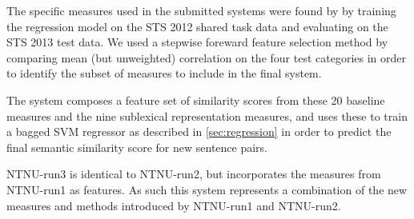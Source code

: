 
The specific measures used in the submitted systems were found by by training the regression model on the STS 2012 shared task data and evaluating on the STS 2013 test data. We used a stepwise foreward feature selection method by comparing mean (but unweighted) correlation on the four test categories in order to identify the subset of measures to include in the final system.

The system composes a feature set of similarity scores from these 20 baseline measures and the nine sublexical representation measures, and uses these to train a bagged SVM regressor as described in \ref{sec:regression} in order to predict the final semantic similarity score for new sentence pairs.

NTNU-run3 is identical to NTNU-run2, but incorporates the measures from NTNU-run1 as features. As such this system represents a combination of the new measures and methods introduced by NTNU-run1 and NTNU-run2.


